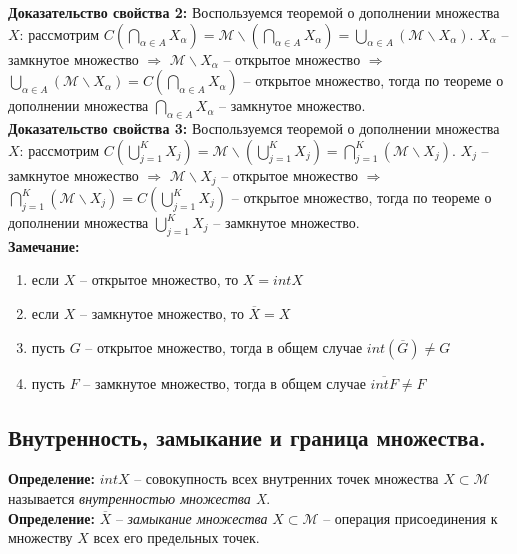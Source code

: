 \documentclass[a4paper,12pt]{article} %
\begin{document}
\noindent \textbf{Доказательство свойства 2:} Воспользуемся теоремой о дополнении множества $X$: рассмотрим $C(\bigcap \limits_{\alpha \in A} X_{\alpha}) = \mathscr{M} \backslash (\bigcap \limits_{\alpha \in A} X_{\alpha}) = \bigcup \limits_{\alpha \in A} (\mathscr{M} \backslash X_{\alpha})$. $X_{\alpha}$ -- замкнутое множество $\Rightarrow$ $\mathscr{M} \backslash X_{\alpha}$ -- открытое множество $\Rightarrow$ $\bigcup \limits_{\alpha \in A} (\mathscr{M} \backslash X_{\alpha}) = C(\bigcap \limits_{\alpha \in A} X_{\alpha})$ -- открытое множество, тогда по теореме о дополнении множества $\bigcap \limits_{\alpha \in A} X_{\alpha}$ -- замкнутое множество.\\

\noindent \textbf{Доказательство свойства 3:} Воспользуемся теоремой о дополнении множества $X$: рассмотрим $C(\bigcup \limits_{j = 1}^K X_j) = \mathscr{M} \backslash (\bigcup \limits_{j = 1}^K X_j) = \bigcap \limits_{j=1}^K (\mathscr{M} \backslash X_j)$. $X_j$ -- замкнутое множество $\Rightarrow$ $\mathscr{M} \backslash X_j$ -- открытое множество $\Rightarrow$ $\bigcap \limits_{j=1}^K (\mathscr{M} \backslash X_j) = C(\bigcup \limits_{j = 1}^K X_j)$ -- открытое множество, тогда по теореме о дополнении множества $\bigcup \limits_{j = 1}^K X_j$ -- замкнутое множество.\\

\noindent \textbf{Замечание:}

\begin{enumerate}
    \item если $X$ -- открытое множество, то $X = int X$
    \item если $X$ -- замкнутое множество, то $\overline{X} = X$
    \item пусть $G$ -- открытое множество, тогда в общем случае $int(\overline{G}) \neq G$
    \item пусть $F$ -- замкнутое множество, тогда в общем случае $\overline{int F} \neq F$
\end{enumerate}

\subsection*{Внутренность, замыкание и граница множества.}

\noindent \textbf{Определение:} $int X$ -- совокупность всех внутренних точек множества $X \subset \mathscr{M}$ называется \textit{внутренностью множества X}.\\

\noindent \textbf{Определение:} $\overline X$ -- \textit{замыкание множества} $X \subset \mathscr{M}$ -- операция присоединения к множеству $X$ всех его предельных точек.\\
\end{document}
